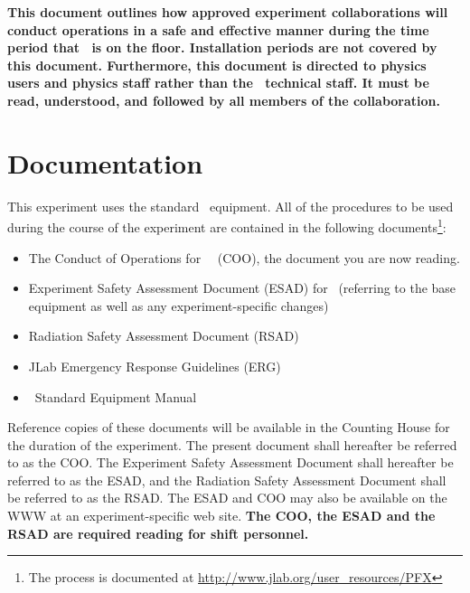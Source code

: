 \documentclass[10pt]{article}
\begin{document}
{\bf This document outlines how approved experiment collaborations will conduct
operations in a safe and effective manner during the time period that
\EXPTS\  is on the floor. Installation
periods are not covered by this document.
Furthermore, this document is directed to physics users and
physics staff rather than the \HALL\ technical staff.  It must be read,
understood, and followed by all members of the collaboration. }

\section{Documentation}

This experiment uses the standard \HALL\ equipment.
All of the procedures to be used during the course of the experiment are contained in the following
documents\footnote{The process is documented at \url{http://www.jlab.org/user_resources/PFX} }:

\begin{itemize}

\item  The Conduct of Operations for \HALL\ \EXPTS\
 (COO), the document you are now reading.

\item   Experiment Safety Assessment Document (ESAD)
for \EXPTS\ (referring to the base equipment as well as any
experiment-specific changes)

\item Radiation Safety Assessment Document (RSAD)

\item JLab Emergency Response Guidelines (ERG)

\item \HALL\ Standard Equipment Manual

\end{itemize}


Reference copies of these documents will be available in the Counting
House for the duration of the experiment. The present document shall
hereafter be referred to as the COO. The Experiment Safety Assessment
Document shall hereafter be referred to as the ESAD, and the
Radiation Safety Assessment Document shall be referred to as the RSAD.
The ESAD and COO may also be available on the WWW at an experiment-specific
web site. {\bf The COO, the ESAD and the RSAD are required reading for
shift personnel.}
\end{document}
